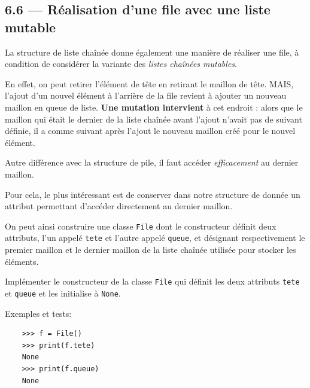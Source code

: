 \documentclass[a4paper,17pt]{extarticle}
\begin{document}
    \hypertarget{ruxe9alisation-dune-file-avec-une-liste-mutable}{%
\subsection{6.6 --- Réalisation d'une file avec une liste
mutable}\label{ruxe9alisation-dune-file-avec-une-liste-mutable}}

    La structure de liste chaînée donne également une manière de réaliser
une file, à condition de considérer la variante des \emph{listes
chaînées mutables}.

En effet, on peut retirer l'élément de tête en retirant le maillon de
tête. MAIS, l'ajout d'un nouvel élément à l'arrière de la file revient à
ajouter un nouveau maillon en queue de liste. \textbf{Une mutation
intervient} à cet endroit : alors que le maillon qui était le dernier de
la liste chaînée avant l'ajout n'avait pas de suivant définie, il a
comme suivant après l'ajout le nouveau maillon créé pour le nouvel
élément.

    Autre différence avec la structure de pile, il faut accéder
\emph{efficacement} au dernier maillon.

Pour cela, le plus intéressant est de conserver dans notre structure de
donnée un attribut permettant d'accéder directement au dernier maillon.

    On peut ainsi construire une classe \texttt{File} dont le constructeur
définit deux attributs, l'un appelé \texttt{tete} et l'autre appelé
\texttt{queue}, et désignant respectivement le premier maillon et le
dernier maillon de la liste chaînée utilisée pour stocker les éléments.

Implémenter le constructeur de la classe \texttt{File} qui définit les
deux attributs \texttt{tete} et \texttt{queue} et les initialise à
\texttt{None}.

Exemples et tests:

\begin{verbatim}
    >>> f = File()
    >>> print(f.tete)
    None
    >>> print(f.queue)
    None
\end{verbatim}
\end{document}
